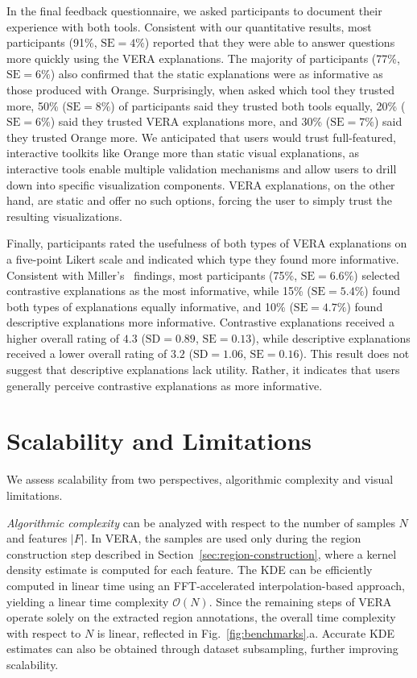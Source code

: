 \documentclass[lettersize,journal]{IEEEtran}
\begin{document}
In the final feedback questionnaire, we asked participants to document their experience with both tools. Consistent with our quantitative results, most participants (91\%, $\text{SE}=4\%$) reported that they were able to answer questions more quickly using the VERA explanations. The majority of participants (77\%, $\text{SE}=6\%$) also confirmed that the static explanations were as informative as those produced with Orange.
Surprisingly, when asked which tool they trusted more, 50\% ($\text{SE}=8\%$) of participants said they trusted both tools equally, 20\% ($\text{SE}=6\%$) said they trusted VERA explanations more, and 30\% ($\text{SE}=7\%$) said they trusted Orange more. 
We anticipated that users would trust full-featured, interactive toolkits like Orange more than static visual explanations, as interactive tools enable multiple validation mechanisms and allow users to drill down into specific visualization components. VERA explanations, on the other hand, are static and offer no such options, forcing the user to simply trust the resulting visualizations.

Finally, participants rated the usefulness of both types of VERA explanations on a five-point Likert scale and indicated which type they found more informative. Consistent with Miller's~\cite{Miller2019} findings, most participants (75\%, $\text{SE}=6.6\%$) selected contrastive explanations as the most informative, while 15\% ($\text{SE}=5.4\%$) found both types of explanations equally informative, and 10\% ($\text{SE}=4.7\%$) found descriptive explanations more informative.
Contrastive explanations received a higher overall rating of $4.3$ ($\text{SD}= 0.89$, $\text{SE}=0.13$), while descriptive explanations received a lower overall rating of $3.2$ ($\text{SD}= 1.06$, $\text{SE}=0.16$).
This result does not suggest that descriptive explanations lack utility. Rather, it indicates that users generally perceive contrastive explanations as more informative.

\section{Scalability and Limitations}
\label{sec:scalability}

We assess scalability from two perspectives, algorithmic complexity and visual limitations.

\textit{Algorithmic complexity} can be analyzed with respect to the number of samples $N$ and features $|F|$.
In VERA, the samples are used only during the region construction step described in Section~\ref{sec:region-construction}, where a kernel density estimate is computed for each feature. The KDE can be efficiently computed in linear time using an FFT-accelerated interpolation-based approach, yielding a linear time complexity $\mathcal{O}(N)$.
Since the remaining steps of VERA operate solely on the extracted region annotations, the overall time complexity with respect to $N$ is linear, reflected in Fig.~\ref{fig:benchmarks}.a. Accurate KDE estimates can also be obtained through dataset subsampling, further improving scalability.
\end{document}
